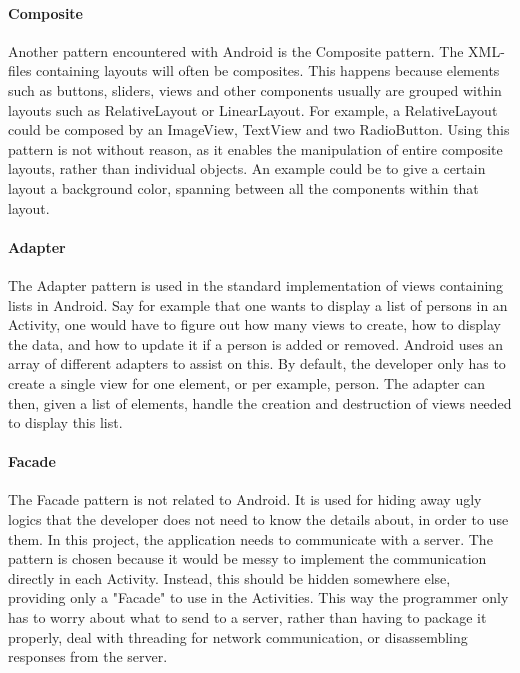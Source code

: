 \paragraph{Composite}
Another pattern encountered with Android is the Composite pattern. The XML-files containing layouts will often be composites. This happens because elements such as buttons, sliders, views and other components usually are grouped within layouts such as RelativeLayout or LinearLayout. For example, a RelativeLayout could be composed by an ImageView, TextView and two RadioButton. Using this pattern is not without reason, as it enables the manipulation of entire composite layouts, rather than individual objects. An example could be to give a certain layout a background color, spanning between all the components within that layout.

\paragraph{Adapter}
The Adapter pattern is used in the standard implementation of views containing lists in Android. Say for example that one wants to display a list of persons in an Activity, one would have to figure out how many views to create, how to display the data, and how to update it if a person is added or removed. Android uses an array of different adapters to assist on this. By default, the developer only has to create a single view for one element, or per example, person. The adapter can then, given a list of elements, handle the creation and destruction of views needed to display this list.

\paragraph{Facade}
The Facade pattern is not related to Android. It is used for hiding away ugly logics that the developer does not need to know the details about, in order to use them. In this project, the application needs to communicate with a server. The pattern is chosen because it would be messy to implement the communication directly in each Activity. Instead, this should be hidden somewhere else, providing only a "Facade" to use in the Activities. This way the programmer only has to worry about what to send to a server, rather than having to package it properly, deal with threading for network communication, or disassembling responses from the server.

